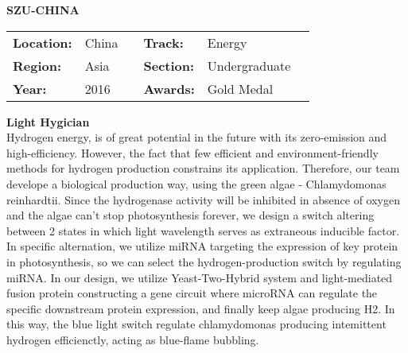 \noindent\textbf{\uppercase{SZU-China}} 
\FloatBarrier
\begin{table}[h]
\begin{tabular}{lp{2.5cm}llll}
\textbf{Location:} & China & \multicolumn{1}{|l}{} & \textbf{Track:}   & Energy \\
\textbf{Region:}   & Asia   & \multicolumn{1}{|l}{} & \textbf{Section:} & Undergraduate \\
\textbf{Year:}     & 2016   & \multicolumn{1}{|l}{} & \textbf{Awards:}  & Gold Medal
\end{tabular}
\end{table} 
\FloatBarrier
\noindent\textbf{Light Hygician} \vspace{.2cm}\\
Hydrogen energy, is of great potential in the future with its zero-emission and high-efficiency. However, the fact that few efficient and environment-friendly methods for hydrogen production constrains its application. Therefore, our team develope a biological production way, using the green algae - Chlamydomonas reinhardtii. Since the hydrogenase activity will be inhibited in absence of oxygen and the algae can’t stop photosynthesis forever, we design a switch altering between 2 states in which light wavelength serves as extraneous inducible factor. In specific alternation, we utilize miRNA targeting the expression of key protein in photosynthesis, so we can select the hydrogen-production switch by regulating miRNA. In our design, we utilize Yeast-Two-Hybrid system and light-mediated fusion protein constructing a gene circuit where microRNA can regulate the specific downstream protein expression, and finally keep algae producing H2. In this way, the blue light switch regulate chlamydomonas producing intemittent hydrogen efficienctly, acting as blue-flame bubbling.
\vspace{2cm}

